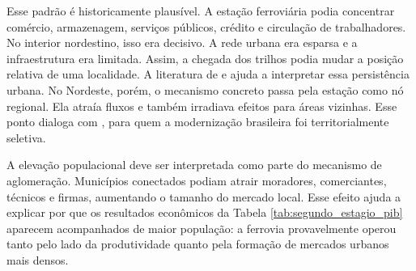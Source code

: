 \documentclass[12pt,a4paper]{article}
\begin{document}
Esse padrão é historicamente plausível. A estação ferroviária podia concentrar comércio, armazenagem, serviços públicos, crédito e circulação de trabalhadores. No interior nordestino, isso era decisivo. A rede urbana era esparsa e a infraestrutura era limitada. Assim, a chegada dos trilhos podia mudar a posição relativa de uma localidade. A literatura de \citet{berger2017} e \citet{jedwab2016} ajuda a interpretar essa persistência urbana. No Nordeste, porém, o mecanismo concreto passa pela estação como nó regional. Ela atraía fluxos e também irradiava efeitos para áreas vizinhas. Esse ponto dialoga com \citet{graham1968}, para quem a modernização brasileira foi territorialmente seletiva.

A elevação populacional deve ser interpretada como parte do mecanismo de aglomeração. Municípios conectados podiam atrair moradores, comerciantes, técnicos e firmas, aumentando o tamanho do mercado local. Esse efeito ajuda a explicar por que os resultados econômicos da Tabela \ref{tab:segundo_estagio_pib} aparecem acompanhados de maior população: a ferrovia provavelmente operou tanto pelo lado da produtividade quanto pela formação de mercados urbanos mais densos.
\end{document}
